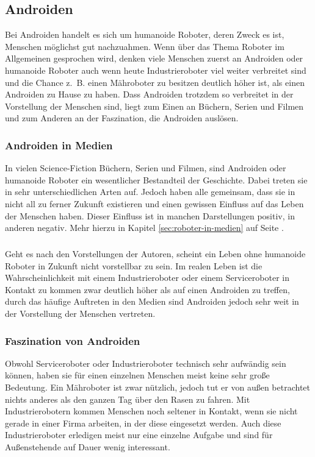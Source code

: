 \subsection{Androiden}\label{sec:androiden}
Bei Androiden handelt es sich um humanoide Roboter, deren Zweck es ist, Menschen
möglichst gut nachzuahmen. Wenn über das Thema Roboter im Allgemeinen gesprochen
wird, denken viele Menschen zuerst an Androiden oder humanoide Roboter auch wenn heute
Industrieroboter viel weiter verbreitet sind und die Chance z.~B. einen
Mähroboter zu besitzen deutlich höher ist, als einen Androiden zu Hause zu
haben. Dass Androiden trotzdem so verbreitet in der Vorstellung der Menschen
sind, liegt zum Einen an Büchern, Serien und Filmen und zum Anderen an der
Faszination, die Androiden auslösen. \cite{Dautenhahn2011}

\subsubsection{Androiden in Medien}
In vielen Science-Fiction Büchern, Serien und Filmen, sind Androiden oder
humanoide Roboter ein wesentlicher Bestandteil der Geschichte. Dabei treten sie
in sehr unterschiedlichen Arten auf. Jedoch haben alle gemeinsam, dass sie in
nicht all zu ferner Zukunft existieren und einen gewissen Einfluss auf das Leben
der Menschen haben. Dieser Einfluss ist in manchen Darstellungen positiv, in
anderen negativ. Mehr hierzu in Kapitel \ref{sec:roboter-in-medien} auf Seite
\pageref{sec:roboter-in-medien}.

\subparagraph{}
Geht es nach den Vorstellungen der Autoren,
scheint ein Leben ohne humanoide Roboter in Zukunft nicht vorstellbar zu sein.
Im realen Leben ist die Wahrscheinlichkeit mit einem Industrieroboter oder einem
Serviceroboter in Kontakt zu kommen zwar deutlich höher als auf einen Androiden
zu treffen, durch das häufige Auftreten in den Medien sind Androiden jedoch
sehr weit in der Vorstellung der Menschen vertreten.

\subsubsection{Faszination von Androiden}
Obwohl Serviceroboter oder Industrieroboter technisch sehr aufwändig sein
können, haben sie für einen einzelnen Menschen meist keine sehr große Bedeutung.
Ein Mähroboter ist zwar nützlich, jedoch tut er von außen betrachtet nichts
anderes als den ganzen Tag über den Rasen zu fahren. Mit Industrierobotern
kommen Menschen noch seltener in Kontakt, wenn sie nicht gerade in einer Firma
arbeiten, in der diese eingesetzt werden. Auch diese Industrieroboter erledigen
meist nur eine einzelne Aufgabe und sind für Außenstehende auf Dauer wenig
interessant.

